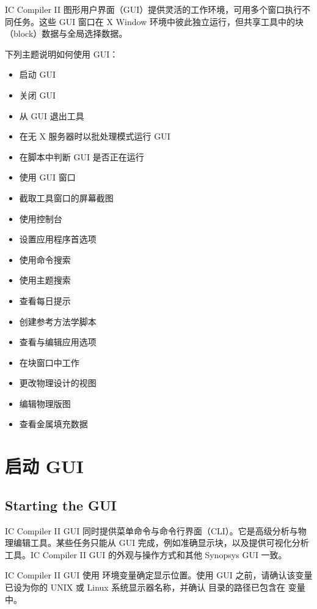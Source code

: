 \label{chap:gui-start}

IC Compiler II 图形用户界面（GUI）提供灵活的工作环境，可用多个窗口执行不同任务。这些 GUI 窗口在 X Window 环境中彼此独立运行，但共享工具中的块（block）数据与全局选择数据。

下列主题说明如何使用 GUI：
\begin{itemize}
  \item 启动 GUI
  \item 关闭 GUI
  \item 从 GUI 退出工具
  \item 在无 X 服务器时以批处理模式运行 GUI
  \item 在脚本中判断 GUI 是否正在运行
  \item 使用 GUI 窗口
  \item 截取工具窗口的屏幕截图
  \item 使用控制台
  \item 设置应用程序首选项
  \item 使用命令搜索
  \item 使用主题搜索
  \item 查看每日提示
  \item 创建参考方法学脚本
  \item 查看与编辑应用选项
  \item 在块窗口中工作
  \item 更改物理设计的视图
  \item 编辑物理版图
  \item 查看金属填充数据
\end{itemize}

\section{启动 GUI}
\subsection*{Starting the GUI}

IC Compiler II GUI 同时提供菜单命令与命令行界面（CLI）。它是高级分析与物理编辑工具。某些任务只能从 GUI 完成，例如准确显示块，以及提供可视化分析工具。IC Compiler II GUI 的外观与操作方式和其他 Synopsys GUI 一致。

IC Compiler II GUI 使用  环境变量确定显示位置。使用 GUI 之前，请确认该变量已设为你的 UNIX 或 Linux 系统显示器名称，并确认  目录的路径已包含在  变量中。

